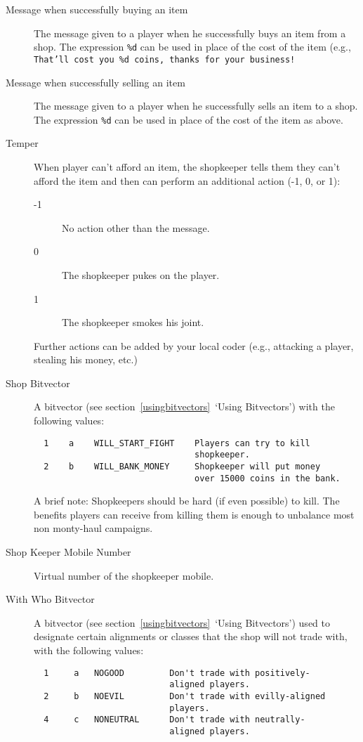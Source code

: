 \documentclass[11pt]{article}
\begin{document}
\begin{description}
\item[Message when successfully buying an item]  The message given to a player when he successfully buys an item from a shop.  The expression \texttt{\%d} can be used in place of the cost of the item (e.g., \texttt{That'll cost you \%d coins, thanks for your business!}
\item[Message when successfully selling an item] The message given to a player when he successfully sells an item to a shop.  The expression \texttt{\%d} can be used in place of the cost of the item as above.
\item[Temper] When player can't afford an item, the shopkeeper tells them they can't afford the item and then can perform an additional action (-1, 0, or 1):
\begin{description}
\item[-1] No action other than the message.
\item[0] The shopkeeper pukes on the player.
\item[1] The shopkeeper smokes his joint.
\end{description}
Further actions can be added by your local coder (e.g., attacking a player, stealing his money, etc.)
\item[Shop Bitvector] A bitvector (see section~\vref{usingbitvectors}~`Using Bitvectors') with the following values:
\begin{verbatim}
  1    a    WILL_START_FIGHT    Players can try to kill
                                shopkeeper.
  2    b    WILL_BANK_MONEY     Shopkeeper will put money
                                over 15000 coins in the bank.
\end{verbatim}
A brief note:  Shopkeepers should be hard (if even possible) to kill.  The benefits players can receive from killing them is enough to unbalance most non monty-haul campaigns.
\item[Shop Keeper Mobile Number] Virtual number of the shopkeeper mobile.
\item[With Who Bitvector] A bitvector (see section~\vref{usingbitvectors}~`Using Bitvectors') used to designate certain alignments or classes that the shop will not trade with, with the following values:
\begin{verbatim}
  1     a   NOGOOD         Don't trade with positively-
                           aligned players.
  2     b   NOEVIL         Don't trade with evilly-aligned
                           players.
  4     c   NONEUTRAL      Don't trade with neutrally-
                           aligned players.

\end{verbatim}
\end{description}
\end{document}
